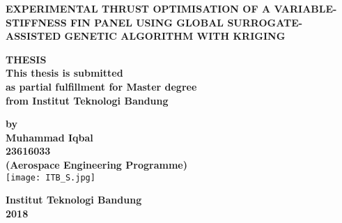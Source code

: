 \begin{titlepage}
\begin{center}

\large
\textbf{EXPERIMENTAL THRUST OPTIMISATION OF A VARIABLE-STIFFNESS FIN PANEL USING GLOBAL SURROGATE-ASSISTED GENETIC ALGORITHM WITH KRIGING}

\vspace{0.25cm}
\normalsize
\textbf{THESIS}\\
\textbf{This thesis is submitted}\\
\textbf{as partial fulfillment for Master degree}\\
\textbf{from Institut Teknologi Bandung}

\vspace{1cm}

\textbf{by}\\
\textbf{Muhammad Iqbal}\\
\textbf{23616033}\\
\textbf{(Aerospace Engineering Programme)}\\

\vspace{2.25cm}
\texttt{[image: ITB\_S.jpg]}
\vspace{1.75cm}

\large
\textbf{Institut Teknologi Bandung}\\
\textbf{2018}

\end{center}
\end{titlepage}
